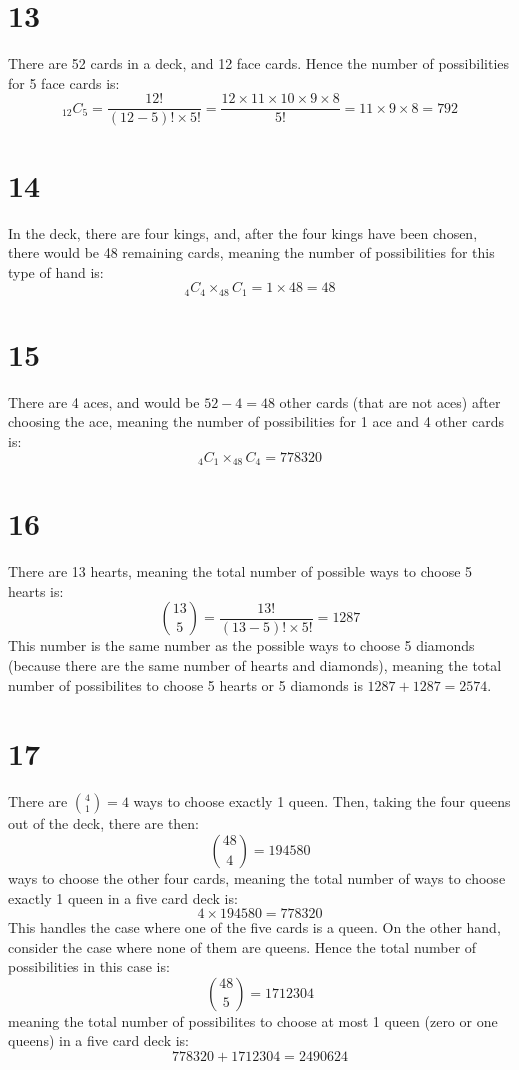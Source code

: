 \documentclass{article}
\theoremstyle{definition}
\newcommand{\?}{\stackrel{?}{=}}
\begin{document}
\section*{13}
There are 52 cards in a deck, and 12 face cards. Hence the number of possibilities for 5 face cards is:
\[ _{12}C_5=\frac{12!}{(12-5)!\times 5!}=\frac{12\times 11\times 10\times 9\times 8}{5!}=11\times 9\times 8=792 \]

\section*{14}
In the deck, there are four kings, and, after the four kings have been chosen, there would be 48 remaining cards, meaning the number of possibilities for 
this type of hand is:
\[ _4C_4\times _{48}C_1=1\times 48=48 \]

\section*{15}
There are 4 aces, and would be $52-4=48$ other cards (that are not aces) after choosing the ace, 
meaning the number of possibilities for 1 ace and 4 other cards is:
\[ _4C_1\times _{48}C_4=778320 \] 

\section*{16}
There are 13 hearts, meaning the total number of possible ways to choose 5 hearts is:
\[ \binom{13}{5}=\frac{13!}{(13-5)!\times 5!}=1287 \] This number is the same number as the possible ways to choose 5 diamonds (because there are the same number of hearts and diamonds), 
meaning the total number of possibilites to choose 5 hearts or 5 diamonds is $1287+1287=2574$.

\section*{17}
There are $\binom{4}{1}=4$ ways to choose exactly 1 queen. Then, taking the four queens out of the deck, there are then:
\[ \binom{48}{4}=194580 \] ways to choose the other four cards, meaning the total number of ways to choose exactly 1 queen in a five card deck is:
\[ 4\times 194580=778320 \] This handles the case where one of the five cards is a queen. On the other hand, consider the case where none of them are queens. Hence the total number of possibilities in this case is:
\[ \binom{48}{5}=1712304 \] meaning the total number of possibilites to choose at most 1 queen (zero or one queens) in a five card deck is:
\[ 778320+1712304=2490624 \]
\end{document}
